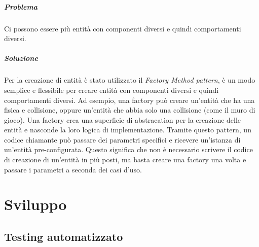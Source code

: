 \documentclass[a4paper,12pt]{report}
\begin{document}
\paragraph{Problema} Ci possono essere più entità con componenti diversi e quindi comportamenti diversi.
\paragraph{Soluzione} Per la creazione di entità è stato utilizzato il \textit{Factory Method pattern}, è un modo semplice e flessibile 
per creare entità con componenti diversi e quindi comportamenti diversi. Ad esempio, una factory può creare un'entità che ha una 
fisica e collisione, oppure un’entità che abbia solo una collisione (come il muro di gioco). Una factory crea una superficie di 
abstracation per la creazione delle entità e nasconde la loro logica di implementazione. Tramite questo pattern, un codice chiamante può 
passare dei parametri specifici e ricevere un'istanza di un'entità pre-configurata. Questo significa che non è necessario scrivere il codice 
di creazione di un'entità in più posti, ma basta creare una factory una volta e passare i parametri a seconda dei casi d'uso.

\chapter{Sviluppo}
\section{Testing automatizzato}
\end{document}
